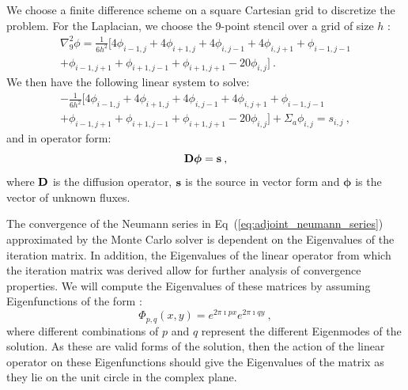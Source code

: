 \documentclass{mc2013}
\begin{document}
We choose a finite difference scheme on a square Cartesian grid to
discretize the problem. For the Laplacian, we choose the 9-point
stencil over a grid of size $h$ \cite{leveque_finite_2007}:
\begin{multline}
  \nabla^2_9\phi = \frac{1}{6h^2}[4 \phi_{i-1,j} + 4 \phi_{i+1,j}
    + 4 \phi_{i,j-1} + 4 \phi_{i,j+1} + \phi_{i-1,j-1}\\ +
    \phi_{i-1,j+1} + \phi_{i+1,j-1} + \phi_{i+1,j+1} - 20
    \phi_{i,j}]\:.
  \label{eq:nine_point_stencil}
\end{multline}
We then have the following linear system to solve:
\begin{multline}
  -\frac{1}{6h^2}[4 \phi_{i-1,j} + 4 \phi_{i+1,j} + 4
    \phi_{i,j-1} + 4 \phi_{i,j+1} + \phi_{i-1,j-1}\\ + \phi_{i-1,j+1}
    + \phi_{i+1,j-1} + \phi_{i+1,j+1} - 20 \phi_{i,j}] + \Sigma_a
  \phi_{i,j} = s_{i,j}\:,
  \label{eq:fd_system}
\end{multline}
and in operator form:
\begin{equation}
  \mathbf{D}\boldsymbol{\phi}=\mathbf{s}\:,
  \label{eq:operator_system}
\end{equation}
where $\mathbf{D}$ is the diffusion operator, $\mathbf{s}$ is the source in
vector form and $\boldsymbol{\phi}$ is the vector of unknown fluxes.

\label{sec:spectral_analysis}

The convergence of the Neumann series in
Eq~(\ref{eq:adjoint_neumann_series}) approximated by the Monte Carlo
solver is dependent on the Eigenvalues of the iteration matrix. In
addition, the Eigenvalues of the linear operator from which the
iteration matrix was derived allow for further analysis of convergence
properties. We will compute the Eigenvalues of these matrices by
assuming Eigenfunctions of the form \cite{leveque_finite_2007}:
\begin{equation}
  \Phi_{p,q}(x,y) = e^{2 \pi \imath p x} e^{2 \pi \imath q y}\:,
  \label{eq:eigenfunction_form}
\end{equation}
where different combinations of $p$ and $q$ represent the different
Eigenmodes of the solution. As these are valid forms of the solution,
then the action of the linear operator on these Eigenfunctions should
give the Eigenvalues of the matrix as they lie on the unit circle in
the complex plane.

\label{subsec:iteration_spectrum}
\end{document}
